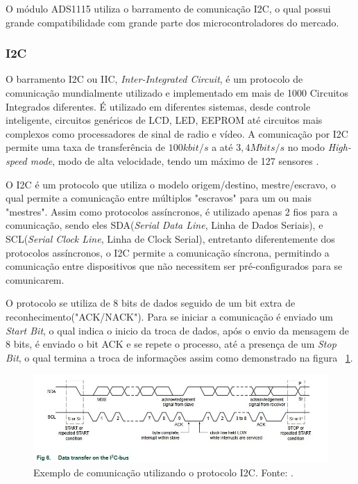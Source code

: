 O módulo ADS1115 utiliza o barramento de comunicação I2C, o qual possui grande compatibilidade com grande parte dos microcontroladores do mercado.

\subsubsection{I2C}

O barramento I2C ou IIC, \textit{Inter-Integrated Circuit}, é um protocolo de comunicação mundialmente utilizado e implementado em mais de 1000 Circuitos Integrados diferentes. É utilizado em diferentes sistemas, desde controle inteligente, circuitos genéricos de LCD, LED, EEPROM até circuitos mais complexos como processadores de sinal de radio e vídeo. A comunicação por I2C permite uma taxa de transferência de $100 kbit/s$ a até $3,4 Mbits/s$ no modo \textit{High-speed mode}, modo de alta velocidade, tendo um máximo de 127 sensores \cite{semiconductors2000i2c}.

O I2C é um protocolo que utiliza o modelo origem/destino, mestre/escravo, o qual permite a comunicação entre múltiplos "escravos" para um ou mais "mestres". Assim como protocolos assíncronos, é utilizado apenas 2 fios para a comunicação, sendo eles SDA(\textit{Serial Data Line}, Linha de Dados Seriais), e SCL(\textit{Serial Clock Line}, Linha de Clock Serial), entretanto diferentemente dos protocolos assíncronos, o I2C permite a comunicação síncrona, permitindo a comunicação entre dispositivos que não necessitem ser pré-configurados para se comunicarem.

O protocolo se utiliza de 8 bits de dados seguido de um bit extra de reconhecimento("ACK/NACK"). Para se iniciar a comunicação é enviado um \textit{Start Bit}, o qual indica o inicio da troca de dados, após o envio da mensagem de 8 bits, é enviado o bit ACK e se repete o processo, até a presença de um \textit{Stop Bit}, o qual termina a troca de informações assim como demonstrado na figura ~\ref{fig:I2C1}.

\FloatBarrier
\begin{figure}[!htbp]
	\centering
	\includegraphics[scale=0.7]{imagens/I2C}
	\caption{Exemplo de comunicação utilizando o protocolo I2C. Fonte: \cite{semiconductors2000i2c}. }
	
	\label{fig:I2C1}
\end{figure}
\FloatBarrier

